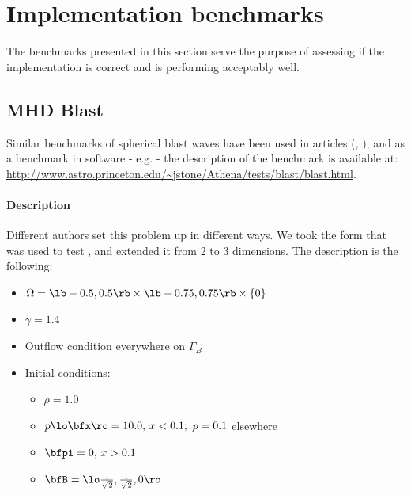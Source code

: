 \section{Implementation benchmarks}
The benchmarks presented in this section serve the purpose of assessing if the implementation is correct and is performing acceptably well.

\subsection{MHD Blast}
Similar benchmarks of spherical blast waves have been used in articles (\citep{blast1}, \citep{blast2}), and as a benchmark in software - e.g. \citep{athena} - the description of the benchmark is available at:\\
\url{http://www.astro.princeton.edu/~jstone/Athena/tests/blast/blast.html}.


\paragraph{Description}
Different authors set this problem up in different ways. We took the form that was used to test \citep{athena}, and extended it from 2 to 3 dimensions. The description is the following:
\begin{itemize}
    \item $\Omega = \lb-0.5, 0.5\rb \times \lb-0.75, 0.75\rb \times \{0\}$
    \item $\gamma = 1.4$
    \item Outflow condition everywhere on $\Gamma_B$
    \item Initial conditions:
    \begin{itemize}
        \item $\rho = 1.0$
        \item $p\lo\bfx\ro = 10.0,\,x<0.1;\ p = 0.1$ elsewhere
        \item $\bfpi = 0,\,x>0.1$
        \item $\bfB = \lo\frac{1}{\sqrt{2}}, \frac{1}{\sqrt{2}}, 0\ro$
    \end{itemize}
   \end{itemize}

